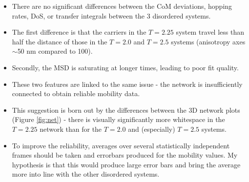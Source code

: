 \documentclass[12pt]{article}
\begin{document}
\begin{itemize}
    \item{There are no significant differences between the CoM deviations, hopping rates, DoS, or transfer integrals between the 3 disordered systems.}
    \item{The first difference is that the carriers in the $T = 2.25$ system travel less than half the distance of those in the $T = 2.0$ and $T = 2.5$ systems (anisotropy axes $\sim$50 nm compared to 100).}
    \item{Secondly, the MSD is saturating at longer times, leading to poor fit quality.}
    \item{These two features are linked to the same issue - the network is insufficiently connected to obtain reliable mobility data.}
    \item{This suggestion is born out by the differences between the 3D network plots (Figure \ref{fig:net}) - there is visually significantly more whitespace in the $T = 2.25$ network than for the $T = 2.0$ and (especially) $T = 2.5$ systems.}
    \item{To improve the reliability, averages over several statistically independent frames should be taken and errorbars produced for the mobility values. My hypothesis is that this would produce large error bars and bring the average more into line with the other disordered systems.}
\end{itemize}




\end{document}
